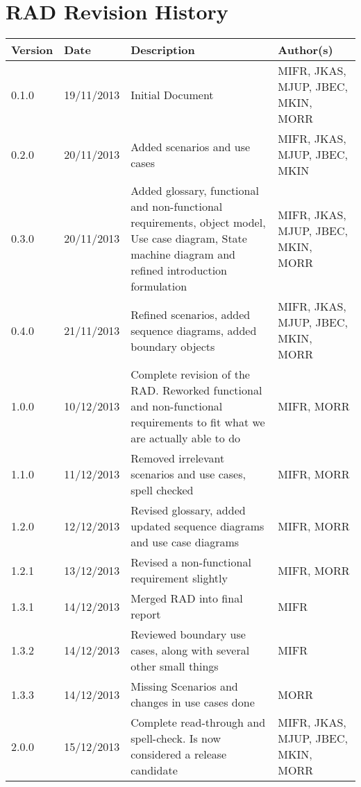 \section{RAD Revision History}
\begin{center}
    \begin{tabular}{ | l | l | p{6cm} | p{4cm} |}
    \hline
    Version & Date & Description & Author(s) \\ \hline
    0.1.0 & 19/11/2013 & Initial Document & MIFR, JKAS, MJUP, JBEC, MKIN, MORR
    \\ \hline
    0.2.0 & 20/11/2013 & Added scenarios and use cases & MIFR, JKAS, MJUP, JBEC, MKIN
    \\ \hline
    0.3.0 & 20/11/2013 & Added glossary, functional and non-functional requirements, object model, Use case diagram, State machine diagram and refined introduction formulation & MIFR, JKAS, MJUP, JBEC, MKIN, MORR
    \\ \hline
    0.4.0 & 21/11/2013 & Refined scenarios, added sequence diagrams, added boundary objects & MIFR, JKAS, MJUP, JBEC, MKIN, MORR
    \\ \hline
    1.0.0 & 10/12/2013 & Complete revision of the RAD. Reworked functional and non-functional requirements to fit what we are actually able to do & MIFR, MORR
    \\ \hline
    1.1.0 & 11/12/2013 & Removed irrelevant scenarios and use cases, spell checked & MIFR, MORR
    \\ \hline
    1.2.0 & 12/12/2013 & Revised glossary, added updated sequence diagrams and use case diagrams & MIFR, MORR
    \\ \hline
    1.2.1 & 13/12/2013 & Revised a non-functional requirement slightly & MIFR, MORR
    \\ \hline
    1.3.1 & 14/12/2013 & Merged RAD into final report & MIFR
    \\ \hline
    1.3.2 & 14/12/2013 & Reviewed boundary use cases, along with several other small things & MIFR
    \\ \hline
    1.3.3 & 14/12/2013 & Missing Scenarios and changes in use cases done & MORR
    \\ \hline
    2.0.0 & 15/12/2013 & Complete read-through and spell-check. Is now considered a release candidate & MIFR, JKAS, MJUP, JBEC, MKIN, MORR
    \\ \hline
    \end{tabular}
\end{center}

